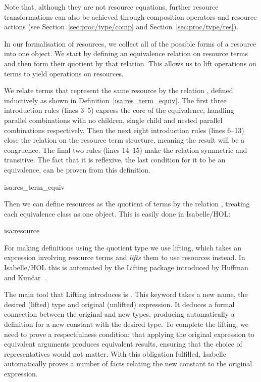 \documentclass[class=smolathesis,crop=false]{standalone}
\begin{document}
Note that, although they are not resource equations, further resource transformations can also be achieved through composition operators and resource actions (see Section~\ref{sec:proc/type/comp} and Section~\ref{sec:proc/type/res}).

In our formalisation of resources, we collect all of the possible forms of a resource into one object.
We start by defining an equivalence relation on resource terms and then form their quotient by that relation.
This allows us to lift operations on terms to yield operations on resources.

We relate terms that represent the same resource by the relation \isa{\isasymsim}, defined inductively as shown in Definition~\ref{isa:res_term_equiv}.
The first three introduction rules (lines 3--5) express the core of the equivalence, handling parallel combinations with no children, single child and nested parallel combinations respectively.
Then the next eight introduction rules (lines 6--13) close the relation on the resource term structure, meaning the result will be a congruence.
The final two rules (lines 14--15) make the relation symmetric and transitive.
The fact that it is reflexive, the last condition for it to be an equivalence, can be proven from this definition.

\begin{isadef}{isa:res_term_equiv}
  \begin{linenumbers*}
    
  \end{linenumbers*}
\end{isadef}

Then we can define resources as the quotient of terms by the relation \isa{\isasymsim}, treating each equivalence class as one object.
This is easily done in Isabelle/HOL:
\begin{isadef}{isa:resource}
  
\end{isadef}

\cbstart
For making definitions using the quotient type we use lifting, which takes an expression involving resource terms and \emph{lifts} them to use resources instead.
In Isabelle/HOL this is automated by the Lifting package introduced by Huffman and Kun\v{c}ar~\cite{huffman_kuncar-2013}.

The main tool that Lifting introduces is .
This keyword takes a new name, the desired (lifted) type and original (unlifted) expression.
It deduces a formal connection between the original and new types, producing automatically a definition for a new constant with the desired type.
To complete the lifting, we need to prove a respectfulness condition: that applying the original expression to equivalent arguments produces equivalent results, ensuring that the choice of representatives would not matter.
With this obligation fulfilled, Isabelle automatically proves a number of facts relating the new constant to the original expression.
\end{document}
